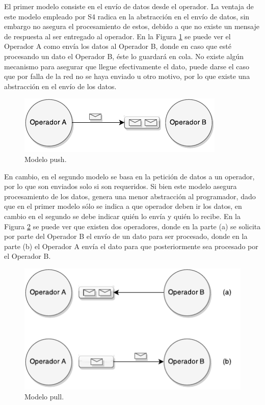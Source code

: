 El primer modelo consiste en el envío de datos desde el operador. La ventaja de este modelo empleado por S4 radica en la abstracción en el envío de datos, sin embargo no asegura el procesamiento de estos, debido a que no existe un mensaje de respuesta al ser entregado al operador. En la Figura \ref{fig:sps-push} se puede ver el Operador A como envía los datos al Operador B, donde en caso que esté procesando un dato el Operador B, éste lo guardará en cola. No existe algún mecanismo para asegurar que llegue efectivamente el dato, puede darse el caso que por falla de la red no se haya enviado u otro motivo, por lo que existe una abstracción en el envío de los datos.

\begin{figure}[ht!]
  \centering
    \includegraphics[scale=1]{images/SPS-Push.pdf}
  \caption{Modelo push.}
  \label{fig:sps-push}
\end{figure}

En cambio, en el segundo modelo se basa en la petición de datos a un operador, por lo que son enviados solo si son requeridos. Si bien este modelo asegura procesamiento de los datos, genera una menor abstracción al programador, dado que en el primer modelo sólo se indica a que operador deben ir los datos, en cambio en el segundo se debe indicar quién lo envía y quién lo recibe. En la Figura \ref{fig:sps-pull} se puede ver que existen dos operadores, donde en la parte (a) se solicita por parte del Operador B el envío de un dato para ser procesado, donde en la parte (b) el Operador A envía el dato para que posteriormente sea procesado por el Operador B.

\begin{figure}[ht!]
  \centering
    \includegraphics[scale=1]{images/SPS-Pull.pdf}
  \caption{Modelo pull.}
  \label{fig:sps-pull}
\end{figure}

